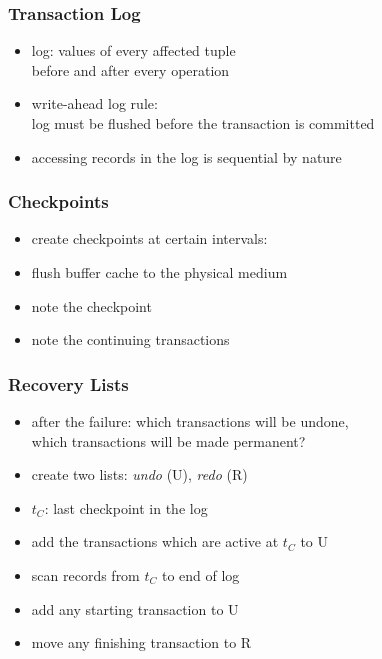 \documentclass[dvipsnames]{beamer}
\theoremstyle{plain}
\begin{document}
\begin{frame}
  \frametitle{Transaction Log}

  \begin{itemize}
    \item \alert{log}: values of every affected tuple\\
      before and after every operation

    \medskip
    \item \alert{write-ahead log rule}:\\
      log must be flushed before the transaction is committed

    \pause
    \medskip
    \item accessing records in the log is sequential by nature
  \end{itemize}
\end{frame}

\begin{frame}
  \frametitle{Checkpoints}

  \begin{itemize}
    \item create \alert{checkpoints} at certain intervals:

    \medskip
    \item flush buffer cache to the physical medium
    \item note the checkpoint
    \item note the continuing transactions
  \end{itemize}
\end{frame}

\begin{frame}
  \frametitle{Recovery Lists}

  \begin{itemize}
    \item after the failure: which transactions will be undone,\\
      which transactions will be made permanent?
    \item create two lists: \emph{undo} (U), \emph{redo} (R)

    \pause
    \medskip
    \item $t_C$: last checkpoint in the log
    \item add the transactions which are active at $t_C$ to U

    \medskip
    \item scan records from $t_C$ to end of log
    \item add any starting transaction to U
    \item move any finishing transaction to R
  \end{itemize}
\end{frame}
\end{document}
